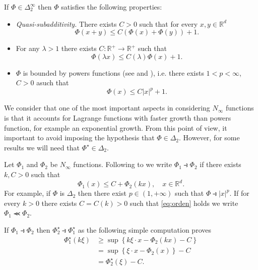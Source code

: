 \documentclass[twoside]{article}
\theoremstyle{remark}
\newcounter{example}[section]
\newcommand{\rr}{\mathbb{R}}
\renewcommand{\leq}{\leqslant}
\renewcommand{\geq}{\geqslant}
\begin{document}
If $\Phi\in\Delta_2^{\infty}$ then $\Phi$ satisfies the following properties:



\begin{itemize}
 \item \emph{Quasi-subadditivity.} There exists $C>0$ such that for every $x,y\in \rr^d$
\begin{equation}\label{eq:quasi-sub-aditividad}
\Phi(x+y)\leq C (\Phi(x)+\Phi(y))+1.
\end{equation}
\item  For any $\lambda>1$ there exists $C:\rr^+\to \rr^+$ such that
\begin{equation}\label{eq:delta2-lambda}
\Phi(\lambda x)\leq C(\lambda)\Phi(x)+1.
\end{equation}
\item $\Phi$ is bounded by powers functions (see \cite[Proof Lemma 2.4]{Desch2001} and \cite[Prop. 1]{cianchi2000local}), i.e. there exists $1<p<\infty$, $C>0$ asuch that
\[\Phi(x)\leq C|x|^p+1.\]

\end{itemize}

We consider that one of the most important aspects in considering $N_{\infty}$ functions is that it accounts for Lagrange functions with  faster growth than powers function, for example an exponential growth. From this point of view, it important to avoid imposing the hypothesis that $\Phi\in \Delta_2$. However, for some results we will need that $\Phi^{\star}\in\Delta_2$. 


Let $\Phi_1$ and $\Phi_2$ be   $N_{\infty}$ functions. Following to \cite{trudinger1974imbedding} we write $\Phi_1\strictif\Phi_2$ if there exists  $k,C>0$ such that
\begin{equation}\label{eq:orden} \Phi_1(x)\leq C+\Phi_2(kx),\quad x\in\rr^d.\end{equation}
For example, if $\Phi$ is $\Delta_2$ then there exist $p\in (1,+\infty)$ such that $\Phi\strictif |x|^p$.  If for every $k>0$ there exists $C=C(k)>0$ such that \eqref{eq:orden} holds we write  $\Phi_1\llcurly\Phi_2$. 

If $\Phi_1\strictif \Phi_2$ then $\Phi^{\star}_2\strictif\Phi^{\star}_1$ as the following simple computation proves 
\[
\begin{split}
  \Phi^{\star}_1(k\xi)&\geq \sup \left\{k\xi\cdot x-\Phi_2(kx)-C\right\}\\
&=\sup \left\{\xi\cdot x-\Phi_2(x)\right\}-C\\
&=\Phi^{\star}_2\left(\xi\right)-C.
\end{split}
\]
\end{document}
